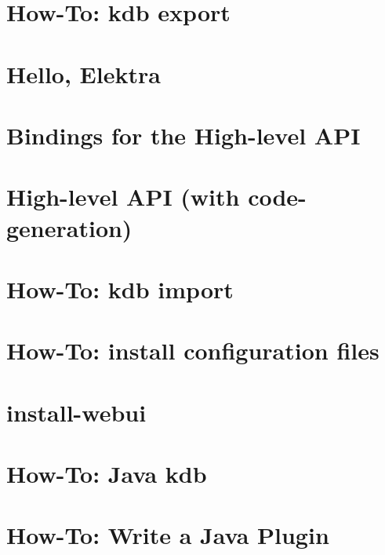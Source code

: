 \let\mypdfximage\pdfximage\def\pdfximage{\immediate\mypdfximage}\documentclass[twoside]{book}
\newcommand{\+}{\discretionary{\mbox{\scriptsize$\hookleftarrow$}}{}{}}
\begin{document}
\chapter{How-\/\+To\+: kdb export}
\label{doc_tutorials_export_md}

\chapter{Hello, Elektra}
\label{doc_tutorials_hello-elektra_md}

\chapter{Bindings for the High-\/level API}
\label{doc_tutorials_highlevel-bindings_md}

\chapter{High-\/level API (with code-\/generation)}
\label{doc_tutorials_highlevel_md}

\chapter{How-\/\+To\+: kdb import}
\label{doc_tutorials_import_md}

\chapter{How-\/\+To\+: install configuration files}
\label{doc_tutorials_install-config-files_md}

\chapter{install-\/webui}
\label{md_doc_tutorials_install_webui}

\chapter{How-\/\+To\+: Java kdb}
\label{doc_tutorials_java-kdb_md}

\chapter{How-\/\+To\+: Write a Java Plugin}
\label{doc_tutorials_java-plugins_md}

\end{document}
